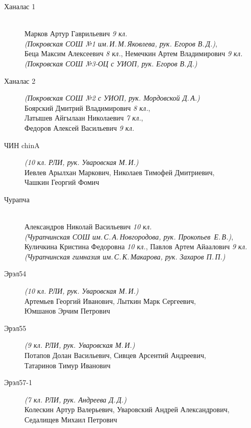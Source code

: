\begin{description}
\item[Ханалас 1] ~ \\
Марков Артур Гаврильевич \textit{9 кл. \\
(Покровская СОШ №1 им.\,И.\,М.\,Яковлева, рук. Егоров В.\,Д.)}, \\
Беца Максим Алексеевич \textit{8 кл.}, Немечкин Артем Владимирович \textit{9 кл.} \\
\textit{(Покровская СОШ №3-ОЦ с УИОП, рук. Егоров В.\,Д.)}

\item[Ханалас 2] \textit{(Покровская СОШ №2 с УИОП, рук. Мордовской Д.\,А.)} \\
Боярский Дмитрий Владимирович \textit{8 кл.}, \\
Латышев Айгылаан Николаевич \textit{7 кл.}, \\
Федоров Алексей Васильевич \textit{9 кл.}

\item[ЧИН chinA] \textit{(10 кл. РЛИ, рук. Уваровская М.\,И.)} \\
Иевлев Арылхан Маркович, Николаев Тимофей Дмитриевич, \\
Чашкин Георгий Фомич

\item[Чурапча] ~ \\
Александров Николай Васильевич \textit{10 кл. \\
(Чурапчинская СОШ им.\,С.\,А.\,Новгородова, рук. Прокопьев~Е.\,В.)}, \\
Куличкина Кристина Федоровна \textit{10 кл.}, Павлов Артем Айаалович \textit{9 кл. \\
(Чурапчинская гимназия им.\,С.\,К.\,Макарова, рук. Захаров П.\,П.)}

\item[Эрэл54] \textit{(10 кл. РЛИ, рук. Уваровская М.\,И.)} \\
Артемьев Георгий Иванович, Лыткин Марк Сергеевич, \\
Юмшанов Эрчим Петрович

\item[Эрэл55] \textit{(9 кл. РЛИ, рук. Уваровская М.\,И.)} \\
Потапов Долан Васильевич, Сивцев Арсентий Андреевич, \\
Татаринов Тимур Иванович

\item[Эрэл57-1] \textit{(7 кл. РЛИ, рук. Андреева Д.\,Д.)} \\
Колескин Артур Валерьевич, Уваровский Андрей Александрович, \\
Седалищев Михаил Петрович


\end{description}
